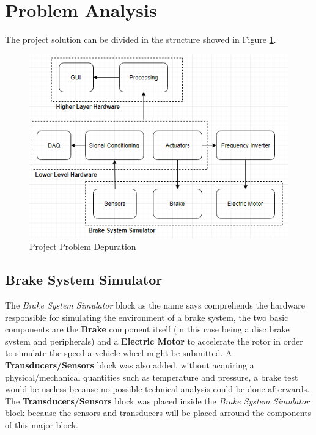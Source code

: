 \section{Problem Analysis}\label{sec:problem-analsysis}

	The project solution can be divided in the structure showed in Figure \ref{fig:projectProblem}.
	
	\begin{figure}[htbp]
		\centering
			\includegraphics[scale=0.9]{figuras/fig-projectProblem}
		\caption{Project Problem Depuration}
		\label{fig:projectProblem}
	\end{figure}
	

	\subsection{Brake System Simulator}\label{ssec:brakeSystemSimulator}
		
		The \textit{Brake System Simulator} block as the name says comprehends the hardware responsible for simulating the environment of a brake system, the two basic components are the \textbf{Brake} component itself (in this case being a disc brake system and peripherals) and a \textbf{Electric Motor} to accelerate the rotor in order to simulate the speed a vehicle wheel might be submitted. A \textbf{Transducers/Sensors} block was also added, without acquiring a physical/mechanical quantities such as temperature and pressure, a brake test would be useless because no possible technical analysis could be done afterwards. The \textbf{Transducers/Sensors} block was placed inside the \textit{Brake System Simulator} block because the sensors and transducers will be placed arround the components of this major block.

